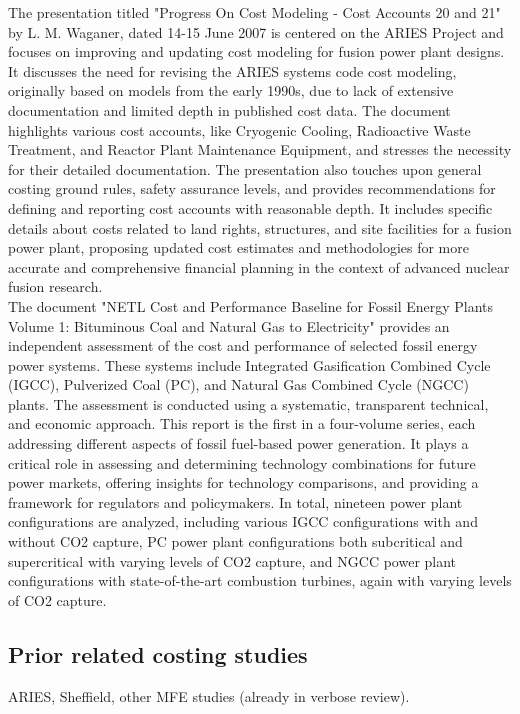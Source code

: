 The presentation titled "Progress On Cost Modeling - Cost Accounts 20 and 21" by L. M. Waganer, dated 14-15 June 2007 \cite{Waganer2007} is centered on the ARIES Project and focuses on improving and updating cost modeling for fusion power plant designs. It discusses the need for revising the ARIES systems code cost modeling, originally based on models from the early 1990s, due to lack of extensive documentation and limited depth in published cost data. The document highlights various cost accounts, like Cryogenic Cooling, Radioactive Waste Treatment, and Reactor Plant Maintenance Equipment, and stresses the necessity for their detailed documentation. The presentation also touches upon general costing ground rules, safety assurance levels, and provides recommendations for defining and reporting cost accounts with reasonable depth. It includes specific details about costs related to land rights, structures, and site facilities for a fusion power plant, proposing updated cost estimates and methodologies for more accurate and comprehensive financial planning in the context of advanced nuclear fusion research.\\

The document "NETL Cost and Performance Baseline for Fossil Energy Plants Volume 1: Bituminous Coal and Natural Gas to Electricity" \cite{JamesCorrespondingAuthor2019} provides an independent assessment of the cost and performance of selected fossil energy power systems. These systems include Integrated Gasification Combined Cycle (IGCC), Pulverized Coal (PC), and Natural Gas Combined Cycle (NGCC) plants. The assessment is conducted using a systematic, transparent technical, and economic approach. This report is the first in a four-volume series, each addressing different aspects of fossil fuel-based power generation. It plays a critical role in assessing and determining technology combinations for future power markets, offering insights for technology comparisons, and providing a framework for regulators and policymakers. In total, nineteen power plant configurations are analyzed, including various IGCC configurations with and without CO2 capture, PC power plant configurations both subcritical and supercritical with varying levels of CO2 capture, and NGCC power plant configurations with state-of-the-art combustion turbines, again with varying levels of CO2 capture.

\subsection{Prior related costing studies}

ARIES, Sheffield, other MFE studies (already in verbose review).


